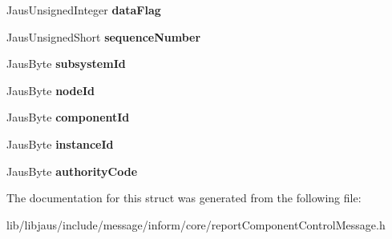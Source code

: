 \begin{DoxyCompactItemize}
\item 
\hypertarget{struct_report_component_control_message_struct_a6ff3f8c5aa678742f0bedf7d9e9fb791}{\-Jaus\-Unsigned\-Integer {\bfseries data\-Flag}}\label{struct_report_component_control_message_struct_a6ff3f8c5aa678742f0bedf7d9e9fb791}

\item 
\hypertarget{struct_report_component_control_message_struct_adfa9cf9d3f840a26bbd190b05b85415e}{\-Jaus\-Unsigned\-Short {\bfseries sequence\-Number}}\label{struct_report_component_control_message_struct_adfa9cf9d3f840a26bbd190b05b85415e}

\item 
\hypertarget{struct_report_component_control_message_struct_a3aa286ec9fdb8eb9762c293f21a2898f}{\-Jaus\-Byte {\bfseries subsystem\-Id}}\label{struct_report_component_control_message_struct_a3aa286ec9fdb8eb9762c293f21a2898f}

\item 
\hypertarget{struct_report_component_control_message_struct_a33198f78ee8ec3314b4aa8470ea6aad8}{\-Jaus\-Byte {\bfseries node\-Id}}\label{struct_report_component_control_message_struct_a33198f78ee8ec3314b4aa8470ea6aad8}

\item 
\hypertarget{struct_report_component_control_message_struct_a3dd42ff9a07a32e5c2a7e230fbe6f137}{\-Jaus\-Byte {\bfseries component\-Id}}\label{struct_report_component_control_message_struct_a3dd42ff9a07a32e5c2a7e230fbe6f137}

\item 
\hypertarget{struct_report_component_control_message_struct_ae65b19cab24f87168b7b8510ed189f95}{\-Jaus\-Byte {\bfseries instance\-Id}}\label{struct_report_component_control_message_struct_ae65b19cab24f87168b7b8510ed189f95}

\item 
\hypertarget{struct_report_component_control_message_struct_ae9853e4b98233d6dd704f1ee3b5e5237}{\-Jaus\-Byte {\bfseries authority\-Code}}\label{struct_report_component_control_message_struct_ae9853e4b98233d6dd704f1ee3b5e5237}

\end{DoxyCompactItemize}


\-The documentation for this struct was generated from the following file\-:\begin{DoxyCompactItemize}
\item 
lib/libjaus/include/message/inform/core/report\-Component\-Control\-Message.\-h\end{DoxyCompactItemize}

